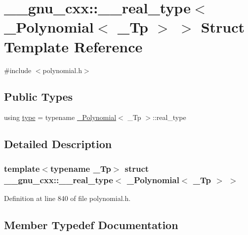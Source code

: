 \hypertarget{struct____gnu__cxx_1_1____real__type_3_01__Polynomial_3_01__Tp_01_4_01_4}{}\section{\+\_\+\+\_\+gnu\+\_\+cxx\+:\+:\+\_\+\+\_\+real\+\_\+type$<$ \+\_\+\+Polynomial$<$ \+\_\+\+Tp $>$ $>$ Struct Template Reference}
\label{struct____gnu__cxx_1_1____real__type_3_01__Polynomial_3_01__Tp_01_4_01_4}


{\ttfamily \#include $<$polynomial.\+h$>$}

\subsection*{Public Types}
\begin{DoxyCompactItemize}
\item 
using \hyperlink{struct____gnu__cxx_1_1____real__type_3_01__Polynomial_3_01__Tp_01_4_01_4_ac0fd9a1c448f5e710c2df57e1c3a3f54}{type} = typename \hyperlink{class____gnu__cxx_1_1__Polynomial}{\+\_\+\+Polynomial}$<$ \+\_\+\+Tp $>$\+::real\+\_\+type
\end{DoxyCompactItemize}


\subsection{Detailed Description}
\subsubsection*{template$<$typename \+\_\+\+Tp$>$\newline
struct \+\_\+\+\_\+gnu\+\_\+cxx\+::\+\_\+\+\_\+real\+\_\+type$<$ \+\_\+\+Polynomial$<$ \+\_\+\+Tp $>$ $>$}



Definition at line 840 of file polynomial.\+h.



\subsection{Member Typedef Documentation}
\mbox{\label{struct____gnu__cxx_1_1____real__type_3_01__Polynomial_3_01__Tp_01_4_01_4_ac0fd9a1c448f5e710c2df57e1c3a3f54}} 
